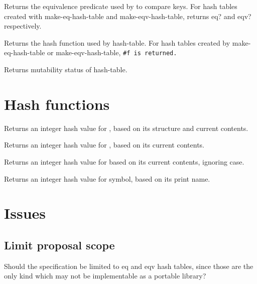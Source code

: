 \documentclass[twoside]{algol60}
\begin{document}
\begin{entry}{}
Returns the equivalence predicate used by  to compare keys.  For hash tables created with {\cf make-eq-hash-table} and {\cf make-eqv-hash-table}, returns {\cf eq?} and {\cf eqv?} respectively.
\end{entry}

\begin{entry}{}
Returns the hash function used by hash-table.  For hash tables created by {\cf make-eq-hash-table} or {\cf make-eqv-hash-table}, \tt{\#f} is returned.
\end{entry}

\begin{entry}{}
Returns mutability status of hash-table.
\end{entry}

\section{Hash functions}

\begin{entry}{}
Returns an integer hash value for , based on its structure and current contents.
\end{entry}

\begin{entry}{}
Returns an integer hash value for , based on its current contents.
\end{entry}

\begin{entry}{}
Returns an integer hash value for  based on its current contents, ignoring case.
\end{entry}

\begin{entry}{}
Returns an integer hash value for symbol, based on its print name.
\end{entry}

\section{Issues}

\subsection{Limit proposal scope}
Should the specification be limited to eq and eqv hash tables, since those are the only kind which may not be implementable as a portable library?
\end{document}

